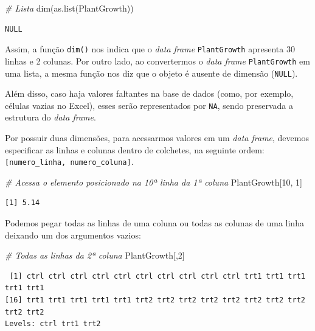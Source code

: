 \documentclass[
  brazilian,
]{book}
\newenvironment{Shaded}{\begin{snugshade}}{\end{snugshade}}
\newcommand{\CommentTok}[1]{\textcolor[rgb]{0.56,0.35,0.01}{\textit{#1}}}
\newcommand{\DecValTok}[1]{\textcolor[rgb]{0.00,0.00,0.81}{#1}}
\newcommand{\FunctionTok}[1]{\textcolor[rgb]{0.00,0.00,0.00}{#1}}
\newcommand{\NormalTok}[1]{#1}
\begin{document}
\begin{Shaded}
\begin{Highlighting}[]
\CommentTok{\# Lista}
\FunctionTok{dim}\NormalTok{(}\FunctionTok{as.list}\NormalTok{(PlantGrowth))}
\end{Highlighting}
\end{Shaded}

\begin{verbatim}
NULL
\end{verbatim}

Assim, a função \texttt{dim()} nos indica que o \emph{data frame} \texttt{PlantGrowth} apresenta 30 linhas e 2 colunas. Por outro lado, ao convertermos o \emph{data frame} \texttt{PlantGrowth} em uma lista, a mesma função nos diz que o objeto é ausente de dimensão (\texttt{NULL}).

Além disso, caso haja valores faltantes na base de dados (como, por exemplo, células vazias no Excel), esses serão representados por \texttt{NA}, sendo preservada a estrutura do \emph{data frame}.

Por possuir duas dimensões, para acessarmos valores em um \emph{data frame}, devemos especificar as linhas e colunas dentro de colchetes, na seguinte ordem: \texttt{{[}numero\_linha,\ numero\_coluna{]}}.

\begin{Shaded}
\begin{Highlighting}[]
\CommentTok{\# Acessa o elemento posicionado na 10ª linha da 1ª coluna}
\NormalTok{PlantGrowth[}\DecValTok{10}\NormalTok{, }\DecValTok{1}\NormalTok{]}
\end{Highlighting}
\end{Shaded}

\begin{verbatim}
[1] 5.14
\end{verbatim}

Podemos pegar todas as linhas de uma coluna ou todas as colunas de uma linha deixando um dos argumentos vazios:

\begin{Shaded}
\begin{Highlighting}[]
\CommentTok{\# Todas as linhas da 2ª coluna}
\NormalTok{PlantGrowth[,}\DecValTok{2}\NormalTok{]}
\end{Highlighting}
\end{Shaded}

\begin{verbatim}
 [1] ctrl ctrl ctrl ctrl ctrl ctrl ctrl ctrl ctrl ctrl trt1 trt1 trt1 trt1 trt1
[16] trt1 trt1 trt1 trt1 trt1 trt2 trt2 trt2 trt2 trt2 trt2 trt2 trt2 trt2 trt2
Levels: ctrl trt1 trt2
\end{verbatim}
\end{document}
